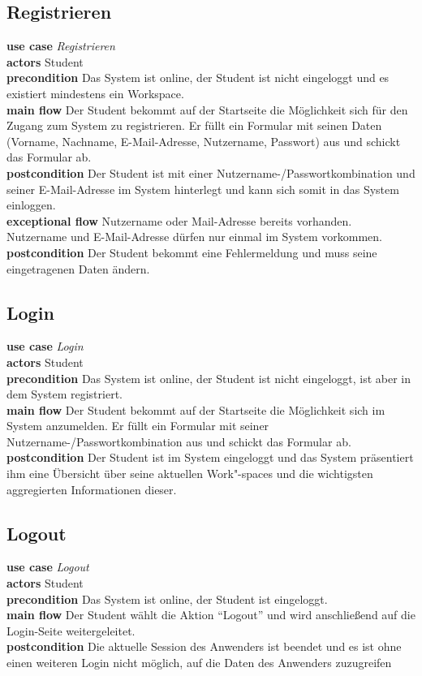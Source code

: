 \subsection{Registrieren}
\textbf{use case} \emph{Registrieren}\\
\textbf{actors} Student\\
\textbf{precondition} Das System ist online, der Student ist nicht eingeloggt und es existiert mindestens ein Workspace.\\
\textbf{main flow} Der Student bekommt auf der Startseite die Möglichkeit sich für den Zugang zum System zu registrieren. Er füllt ein Formular mit seinen Daten (Vorname, Nachname, E-Mail-Adresse, Nutzername, Passwort) aus und schickt das Formular ab.\\
\textbf{postcondition} Der Student ist mit einer Nutzername-/Passwortkombination und seiner E-Mail-Adresse im System hinterlegt und kann sich somit in das System einloggen.\\
\textbf{exceptional flow} Nutzername oder Mail-Adresse bereits vorhanden. Nutzername und E-Mail-Adresse dürfen nur einmal im System vorkommen.\\
\textbf{postcondition} Der Student bekommt eine Fehlermeldung und muss seine eingetragenen Daten ändern.
 
\subsection{Login}
\textbf{use case} \emph{Login}\\
\textbf{actors} Student\\
\textbf{precondition} Das System ist online, der Student ist nicht eingeloggt, ist aber in dem System registriert.\\
\textbf{main flow} Der Student bekommt auf der Startseite die Möglichkeit sich im System anzumelden. Er füllt ein Formular mit seiner Nutzername-/Passwortkombination aus und schickt das Formular ab.\\
\textbf{postcondition} Der Student ist im System eingeloggt und das System präsentiert ihm eine Übersicht über seine aktuellen Work"-spaces und die wichtigsten aggregierten Informationen dieser.

\subsection{Logout}
\textbf{use case} \emph{Logout}\\
\textbf{actors} Student\\
\textbf{precondition} Das System ist online, der Student ist eingeloggt.\\
\textbf{main flow} Der Student wählt die Aktion "`Logout"' und wird anschließend auf die Login-Seite weitergeleitet.\\
\textbf{postcondition} Die aktuelle Session des Anwenders ist beendet und es ist ohne einen weiteren Login nicht möglich, auf die Daten des Anwenders zuzugreifen 

